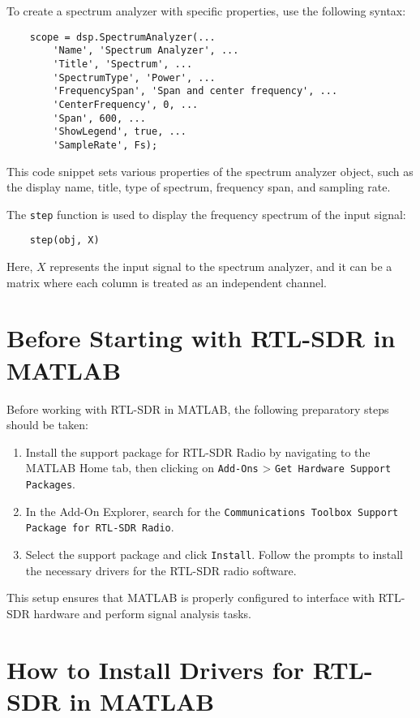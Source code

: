 To create a spectrum analyzer with specific properties, use the following syntax:
\begin{verbatim}
    scope = dsp.SpectrumAnalyzer(...
        'Name', 'Spectrum Analyzer', ...
        'Title', 'Spectrum', ...
        'SpectrumType', 'Power', ...
        'FrequencySpan', 'Span and center frequency', ...
        'CenterFrequency', 0, ...
        'Span', 600, ...
        'ShowLegend', true, ...
        'SampleRate', Fs);
\end{verbatim}
This code snippet sets various properties of the spectrum analyzer object, such as the display name, title, type of spectrum, frequency span, and sampling rate.

The \texttt{step} function is used to display the frequency spectrum of the input signal:
\begin{verbatim}
    step(obj, X)
\end{verbatim}
Here, \( X \) represents the input signal to the spectrum analyzer, and it can be a matrix where each column is treated as an independent channel.

\section*{Before Starting with RTL-SDR in MATLAB}

Before working with RTL-SDR in MATLAB, the following preparatory steps should be taken:

\begin{enumerate}
    \item Install the support package for RTL-SDR Radio by navigating to the MATLAB Home tab, then clicking on \texttt{Add-Ons} > \texttt{Get Hardware Support Packages}.
    \item In the Add-On Explorer, search for the \texttt{Communications Toolbox Support Package for RTL-SDR Radio}.
    \item Select the support package and click \texttt{Install}. Follow the prompts to install the necessary drivers for the RTL-SDR radio software.
\end{enumerate}
This setup ensures that MATLAB is properly configured to interface with RTL-SDR hardware and perform signal analysis tasks.

\section*{How to Install Drivers for RTL-SDR in MATLAB}

